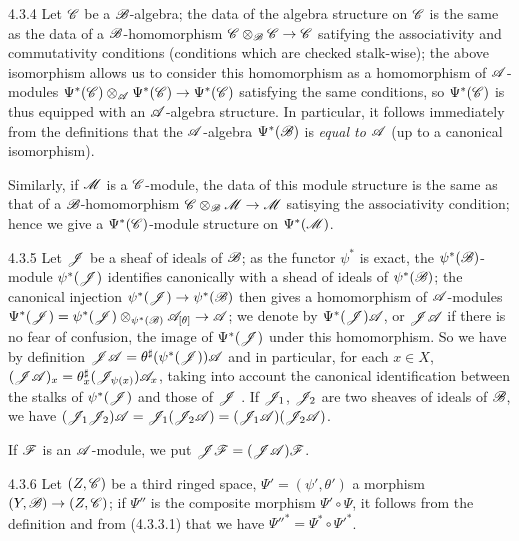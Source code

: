 \begin{env}{4.3.4}
\label{env-0.4.3.4}
Let $\mathscr{C}$ be a $\mathscr{B}$-algebra; the data of the algebra structure on $\mathscr{C}$ is the same
as the data of a $\mathscr{B}$-homomorphism $\mathscr{C}\otimes_\mathscr{B}\mathscr{C}\to\mathscr{C}$ satifying the
associativity and commutativity conditions (conditions which are checked stalk-wise); the
above isomorphism allows us to consider this homomorphism as a homomorphism of
$\mathscr{A}$-modules $\Psi^*(\mathscr{C})\otimes_\mathscr{A}\Psi^*(\mathscr{C})\to\Psi^*(\mathscr{C})$ satisfying the
same conditions, so $\Psi^*(\mathscr{C})$ is thus equipped with an $\mathscr{A}$-algebra structure. In
particular, it follows immediately from the definitions that the $\mathscr{A}$-algebra
$\Psi^*(\mathscr{B})$ is \emph{equal to $\mathscr{A}$} (up to a canonical isomorphism).

Similarly, if $\mathscr{M}$ is a $\mathscr{C}$-module, the data of this module structure is the same
as that of a $\mathscr{B}$-homomorphism $\mathscr{C}\otimes_\mathscr{B}\mathscr{M}\to\mathscr{M}$ satisying the
associativity condition; hence we give a $\Psi^*(\mathscr{C})$-module structure on
$\Psi^*(\mathscr{M})$.
\end{env}

\begin{env}{4.3.5}
\label{env-0.4.3.5}
Let $\mathscr{J}$ be a sheaf of ideals of $\mathscr{B}$; as the functor $\psi^*$ is exact, the
$\psi^*(\mathscr{B})$-module $\psi^*(\mathscr{J})$ identifies canonically with a shead of ideals of
$\psi^*(\mathscr{B})$; the canonical injection $\psi^*(\mathscr{J})\to\psi^*(\mathscr{B})$ then gives a
homomorphism of $\mathscr{A}$-modules
$\Psi^*(\mathscr{J})=\psi^*(\mathscr{J})\otimes_{\psi^*(\mathscr{B})}\mathscr{A}_{[\theta]}\to\mathscr{A}$; we denote
by $\Psi^*(\mathscr{J})\mathscr{A}$, or $\mathscr{J}\mathscr{A}$ if there is no fear of confusion, the image of
$\Psi^*(\mathscr{J})$ under this homomorphism. So we have by definition
$\mathscr{J}\mathscr{A}=\theta^\sharp(\psi^*(\mathscr{J}))\mathscr{A}$ and in particular, for each $x\in X$,
$(\mathscr{J}\mathscr{A})_x=\theta_x^\sharp(\mathscr{J}_{\psi(x)})\mathscr{A}_x$, taking into account the
canonical identification between the stalks of $\psi^*(\mathscr{J})$ and those of $\mathscr{J}$
. If $\mathscr{J}_1$, $\mathscr{J}_2$ are two sheaves of ideals of $\mathscr{B}$, we have
$(\mathscr{J}_1\mathscr{J}_2)\mathscr{A}=\mathscr{J}_1(\mathscr{J}_2\mathscr{A})=(\mathscr{J}_1\mathscr{A})(\mathscr{J}_2\mathscr{A})$.

If $\mathscr{F}$ is an $\mathscr{A}$-module, we put $\mathscr{J}\mathscr{F}=(\mathscr{J}\mathscr{A})\mathscr{F}$.
\end{env}

\begin{env}{4.3.6}
\label{env-0.4.3.6}
Let $(Z,\mathscr{C})$ be a third ringed space, $\Psi'=(\psi',\theta')$ a morphism
$(Y,\mathscr{B})\to(Z,\mathscr{C})$; if $\Psi''$ is the composite morphism $\Psi'\circ\Psi$, it follows
from the definition  and from (4.3.3.1) that we have
${\Psi''}^*=\Psi^*\circ{\Psi'}^*$.
\end{env}

